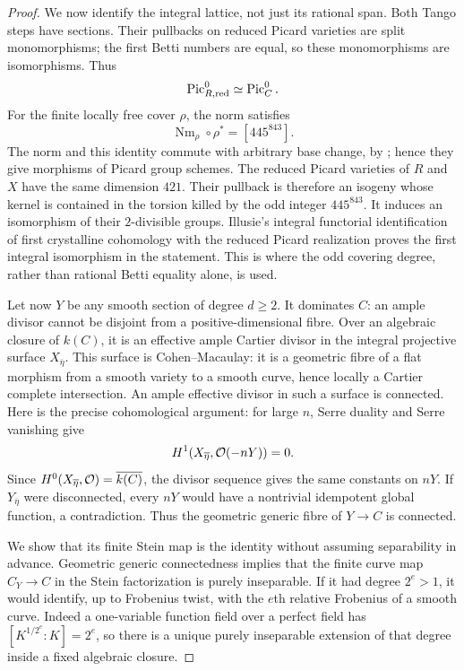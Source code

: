 \begin{proof}
We now identify the integral lattice, not just its rational span.  Both Tango steps have sections.  Their pullbacks on reduced Picard varieties are split monomorphisms; the first Betti numbers are equal, so these monomorphisms are isomorphisms.  Thus
\[
                   \operatorname{Pic}^0_{R,\mathrm{red}}\simeq\operatorname{Pic}^0_C.
\]
For the finite locally free cover $\rho$, the norm satisfies
\[
            \operatorname{Nm}_\rho\circ\rho^*=[445^{843}].
\]
The norm and this identity commute with arbitrary base change, by
\cite[Lemmas~31.18.2 and~31.18.6, Tags~0BCY and~0BD2]{StacksProject}; hence they give morphisms of Picard group schemes.  The reduced Picard varieties of $R$ and $X$ have the same dimension $421$.  Their pullback is therefore an isogeny whose kernel is contained in the torsion killed by the odd integer $445^{843}$.  It induces an isomorphism of their $2$-divisible groups.  Illusie's integral functorial identification of first crystalline cohomology with the reduced Picard realization
\cite[II, Proposition~3.11 and Remark~3.11.2]{Illusie1979DRW}
proves the first integral isomorphism in the statement.  This is where the odd covering degree, rather than rational Betti equality alone, is used.

Let now $Y$ be any smooth section of degree $d\geq2$.  It dominates $C$: an ample divisor cannot be disjoint from a positive-dimensional fibre.  Over an algebraic closure of $k(C)$, it is an effective ample Cartier divisor in the integral projective surface $X_{\overline\eta}$.  This surface is Cohen--Macaulay: it is a geometric fibre of a flat morphism from a smooth variety to a smooth curve, hence locally a Cartier complete intersection.  An ample effective divisor in such a surface is connected.  Here is the precise cohomological argument: for large $n$, Serre duality and Serre vanishing give
\[
               H^1(X_{\overline\eta},\mathcal O(-nY))=0.
\]
Since $H^0(X_{\overline\eta},\mathcal O)=\overline{k(C)}$, the divisor sequence gives the same constants on $nY$.  If $Y_{\overline\eta}$ were disconnected, every $nY$ would have a nontrivial idempotent global function, a contradiction.  Thus the geometric generic fibre of $Y\to C$ is connected.

We show that its finite Stein map is the identity without assuming separability in advance.  Geometric generic connectedness implies that the finite curve map $C_Y\to C$ in the Stein factorization is purely inseparable.  If it had degree $2^e>1$, it would identify, up to Frobenius twist, with the $e$th relative Frobenius of a smooth curve.  Indeed a one-variable function field over a perfect field has $[K^{1/2^e}:K]=2^e$, so there is a unique purely inseparable extension of that degree inside a fixed algebraic closure.


\end{proof}
